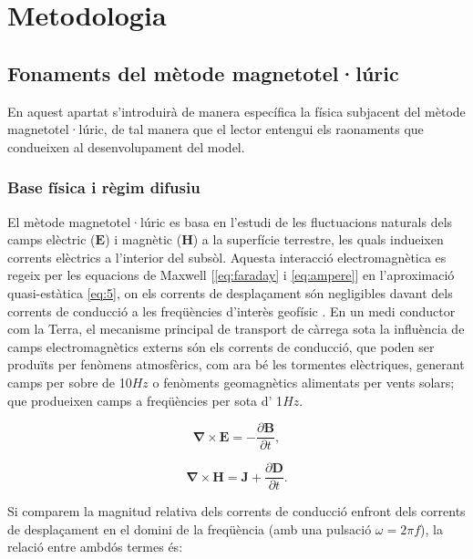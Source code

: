 \documentclass[11pt,a4paper,oneside]{article}
\begin{document}
\section{Metodologia}

\subsection{Fonaments del mètode magnetotel·lúric}

En aquest apartat s'introduirà de manera específica la física subjacent del mètode magnetotel·lúric, de tal manera que el lector entengui els raonaments que condueixen al desenvolupament del model.

\subsubsection{Base física i règim difusiu }

El mètode magnetotel·lúric es basa en l'estudi de les fluctuacions naturals dels camps elèctric ($\mathbf{E}$) i magnètic ($\mathbf{H}$) a la superfície terrestre, les quals indueixen corrents elèctrics a l'interior del subsòl. Aquesta interacció electromagnètica es regeix per les equacions de Maxwell [\cref{eq:faraday} i \cref{eq:ampere}] en l'aproximació quasi-estàtica \cref{eq:5}, on els corrents de desplaçament són negligibles davant dels corrents de conducció a les freqüències d'interès geofísic \citep{chavejones2012}. En un medi conductor com la Terra, el mecanisme principal de transport de càrrega sota la influència de camps electromagnètics externs són els corrents de conducció,  que poden ser produïts per fenòmens atmosfèrics, com ara bé les tormentes elèctriques, generant camps per sobre de 10$Hz$ o fenòments geomagnètics alimentats per vents solars; que produeixen camps a freqüències per sota d' 1$Hz$\citep{rosell2013}.


\begin{equation}
    \boldsymbol{\nabla} \times \mathbf{E} = -\frac{\partial \mathbf{B}}{\partial t},
    \label{eq:faraday}
\end{equation}


\begin{equation}
    \boldsymbol{\nabla} \times \mathbf{H} = \mathbf{J} + \frac{\partial \mathbf{D}}{\partial t}.
    \label{eq:ampere}
\end{equation}

 Si comparem la magnitud relativa dels corrents de conducció enfront dels corrents de desplaçament en el domini de la freqüència (amb una pulsació $\omega = 2\pi f$), la relació entre ambdós termes és:
\vspace{5pt}
\end{document}
